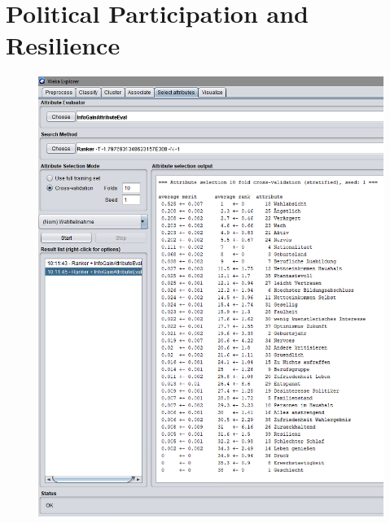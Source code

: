 \section{Political Participation and Resilience}

\begin{figure}[ht]
	\begin{center}
		\includegraphics[scale=0.55,angle=0]{fig/weka_gesis}
	\end{center}
\end{figure}

